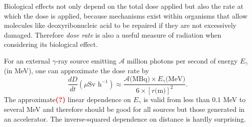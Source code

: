 \documentclass[preprint,aip,cha]{revtex4-1}
\newcommand{\red}[1]{\textcolor{red}{\bf #1}}
\begin{document}
        Biological effects not only depend on the total dose applied but also the rate at which the 
        dose is applied, because mechanisms exist within organisms that allow molecules like deoxyribonucleic acid
        to be repaired if they are not excessively damaged. Therefore {\it dose rate} is also a useful
        measure of radiation when considering its biological effect.

        For an external $\gamma$-ray source emitting $\mathcal{A}$ million photons per second 
        of energy $E_{\gamma}$
        (in MeV), one can approximate the dose rate by 
        \begin{equation}
            \frac{dD}{dt}(\mu\text{Sv h}^{-1}) \approx \frac{\mathcal{A}\text{(MBq)}\times E_{\gamma}\text{(MeV)}}
            {6\times [r\text{(m)}]^2}.
        \end{equation}
        The approximate\red{(?)} linear dependence on $E_{\gamma}$ is valid from less than $0.1$ MeV to several
        MeV and therefore should be good for all sources but those generated in an accelerator.\cite{my68}
        The inverse-squared dependence on distance is hardly surprising.
\end{document}
